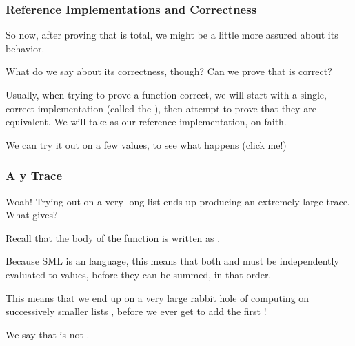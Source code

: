 \documentclass[aspectratio=169]{beamer}
\begin{document}

\begin{frame}[fragile]
  \frametitle{Reference Implementations and Correctness}

  So now, after proving that  is total, we might be a little more assured about its
  behavior.

  \pause
  \vspace{\fill}

  What do we say about its correctness, though? Can we prove that  is correct?

  \pause
  \vspace{\fill}

  Usually, when trying to prove a function correct, we will start with a single, correct implementation
  (called the ), then attempt to prove that they are equivalent. We will
  take  as our reference implementation, on faith.

  \pause
  \vspace{\fill}

  {\color{blue}\href{https://asciinema.org/a/587202}{We can try it out on a few values, to see what happens (click me!)}}

\end{frame}

\begin{frame}[fragile]
  \frametitle{A y Trace}

  Woah! Trying out  on a very long list ends up producing an extremely large trace.
  What gives?

  \vspace{\fill}

  Recall that the body of the  function is written as .

  \pause
  \vspace{\fill}

  Because SML is an  language, this means that both  and 
  must be independently evaluated to values, before they can be summed, in that order.

  \pause
  \vspace{\fill}

  This means that we end up on a very large rabbit hole of computing  on successively
  smaller lists , before we ever get to add the first !

  \pause
  \vspace{\fill}

  We say that  is not .
\end{frame}
\end{document}
